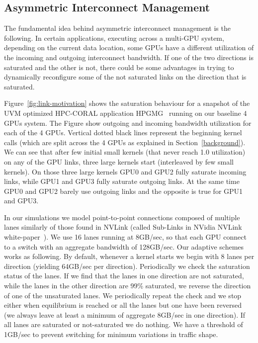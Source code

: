 \subsection{Asymmetric Interconnect Management}
\label{interconnect}

The fundamental idea behind asymmetric interconnect management is the following.
In certain applications, executing across a multi-GPU system, 
depending on the current data location, some GPUs have a different utilization 
of the incoming and outgoing interconnect bandwidth. If one of the two directions
is saturated and the other is not, there could be some advantages in trying to 
dynamically reconfigure some of the not saturated links on the direction 
that is saturated.

Figure~\ref{fig:link-motivation} shows the saturation behaviour for a 
snapshot of the UVM optimized HPC-CORAL application 
HPGMG~\cite{adams2014hpgmg} running on our baseline 4 GPUs system. The Figure 
show outgoing and incoming bandwidth utilization for each of the 4 GPUs. 
Vertical dotted black lines represent the beginning kernel calls (which are 
split across the 4 GPUs as explained in Section~\ref{background}). We can see 
that after few initial small kernels (that never reach 1.0 utilization) on any 
of the GPU links, three large kernels start (interleaved by few small 
kernels). On those three large kernels GPU0 and GPU2 fully saturate incoming 
links, while GPU1 and GPU3 fully saturate outgoing links. At the same time 
GPU0 and GPU2 barely use outgoing links and the opposite is true for GPU1 and 
GPU3.

In our simulations we model point-to-point connections composed of multiple 
lanes similarly of those found in NVLink (called Sub-Links in NVidia NVLink 
white-paper~\cite{pascal-tesla-wp}). We use 16 lanes running at 8GB/sec, so 
that each GPU connect to a switch with an aggregate bandwidth of 128GB/sec. 
Our adaptive schemes works as following. By default, whenever a kernel starts 
we begin with 8 lanes per direction (yielding 64GB/sec per direction). 
Periodically we check the saturation status of the lanes. If we find that 
the lanes in one direction are not saturated, while the lanes in the other 
direction are 99\% saturated, we reverse the direction of one of the 
unsaturated lanes. We periodically repeat the check and we stop either when 
equilibrium is reached or all the lanes but one have been reversed (we always 
leave at least a minimum of aggregate 8GB/sec in one direction). If all 
lanes are saturated or not-saturated we do nothing. We have a threshold of 
1GB/sec to prevent switching for minimum variations in traffic shape.

